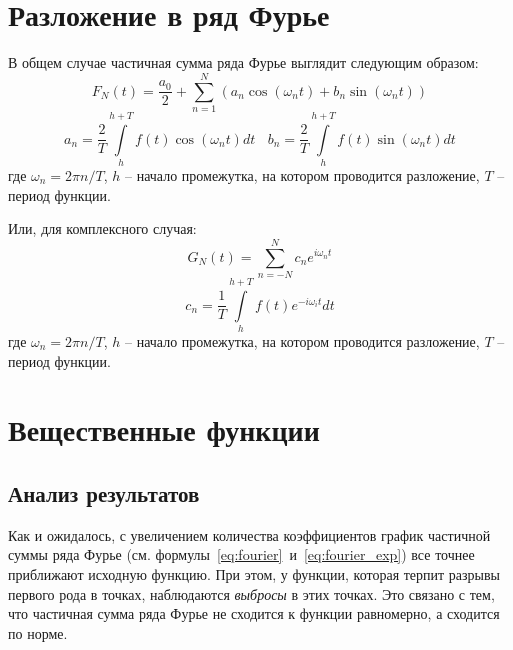 \section{Разложение в ряд Фурье}

В общем случае частичная сумма ряда Фурье выглядит следующим образом: 
\begin{equation}
    F_N(t) = \frac{a_0}{2} + \sum\limits_{n=1}^{N} \left( a_n \cos(\omega_n t) + b_n \sin(\omega_n t) \right)
    \label{eq:fourier}
\end{equation}
\begin{equation}
    a_n = \frac{2}{T} \int\limits_{h}^{h + T} f(t) \cos(\omega_n t) dt ~~~~ b_n = \frac{2}{T} \int\limits_{h}^{h + T} f(t) \sin(\omega_n t) dt 
    \label{eq:fourier_coefficients}
\end{equation}
где $\omega_n = 2\pi n / T$, $h$ -- начало промежутка, на котором проводится разложение, $T$ -- период функции.

Или, для комплексного случая:
\begin{equation}
    G_N(t) = \sum\limits_{n = -N}^{N} c_n e^{i \omega_n t}
    \label{eq:fourier_exp}
\end{equation}
\begin{equation}
    c_n = \frac{1}{T}\int\limits_{h}^{h+T} f(t) e^{-i \omega_i t} dt 
    \label{eq:fourier_coefficients_exp}
\end{equation}
где $\omega_n = 2\pi n / T$,  $h$ -- начало промежутка, на котором проводится разложение, $T$ -- период функции.


\section{Вещественные функции}

 
\FloatBarrier

 
\FloatBarrier


\FloatBarrier


\FloatBarrier

\subsection{Анализ результатов}
Как и ожидалось, с увеличением количества коэффициентов график частичной суммы ряда Фурье (см. формулы~\ref{eq:fourier}~и~\ref{eq:fourier_exp}) 
все точнее приближают исходную функцию. При этом, у функции, которая терпит разрывы первого рода в точках, наблюдаются \textit{выбросы} в этих точках. 
Это связано с тем, что частичная сумма ряда Фурье не сходится к функции равномерно, а сходится по норме. 

